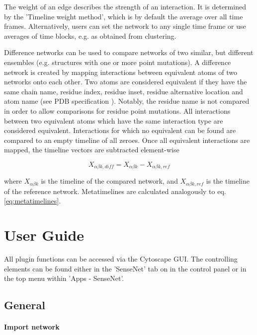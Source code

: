 The weight of an edge describes the strength of an interaction. It is determined by the 'Timeline weight method', which is by default the average over all time frames. Alternatively, users can set the network to any single time frame or use averages of time blocks, e.g. as obtained from clustering. 

Difference networks can be used to compare networks of two similar, but different ensembles (e.g. structures with one or more point mutations). A difference network is created by mapping interactions between equivalent atoms of two networks onto each other. Two atoms are considered equivalent if they have the same chain name, residue index, residue inset, residue alternative location and atom name (see PDB specification \cite{PDB}). Notably, the residue name is not compared in order to allow comparisons for residue point mutations. All interactions between two equivalent atoms which have the same interaction type are considered equivalent. Interactions for which no equivalent can be found are compared to an empty timeline of all zeroes. Once all equivalent interactions are mapped, the timeline vectors are subtracted element-wise

\begin{equation}
    X_{\alpha \beta k,diff} = X_{\alpha \beta k} - X_{\alpha \beta k,ref}
\end{equation}

where $X_{\alpha \beta k}$ is the timeline of the compared network, and $X_{\alpha \beta k,ref}$ is the timeline of the reference network. Metatimelines are calculated analogously to eq. \ref{eq:metatimelines}.

\clearpage
\section{User Guide}

All plugin functions can be accessed via the Cytoscape GUI. The controlling elements can be found either in the 'SenseNet' tab on in the control panel or in the top menu within 'Apps - SenseNet'.

\subsection{General}

\paragraph{Import network}

